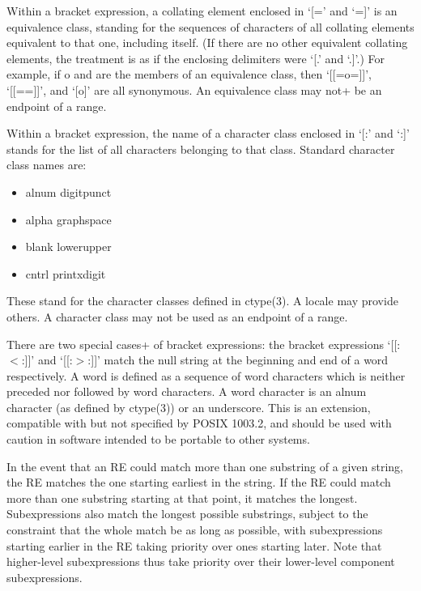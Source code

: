 Within a bracket expression, a collating element enclosed in `[=' and
`=]' is an equivalence class, standing for the sequences of characters
of all collating elements equivalent to that one, including itself.
(If there are no other equivalent collating elements, the treatment is
as if the enclosing delimiters were `[.' and `.]'.) For example, if o
and are the members of an equivalence class, then `[[=o=]]', `[[==]]',
and `[o]' are all synonymous. An equivalence class may not+ be an
endpoint of a range.

Within a bracket expression, the name of a character class enclosed in
`[:' and `:]' stands for the list of all characters belonging to that
class. Standard character class names are:

\begin{itemize}

\item alnum digitpunct
\item alpha graphspace
\item blank lowerupper
\item cntrl printxdigit

\end{itemize}

These stand for the character classes defined in ctype(3). A locale
may provide others. A character class may not be used as an endpoint
of a range.

There are two special cases+ of bracket expressions: the bracket
expressions `[[:$<$:]]' and `[[:$>$:]]' match the null string at the
beginning and end of a word respectively. A word is defined as a
sequence of word characters which is neither preceded nor followed by
word characters. A word character is an alnum character (as defined by
ctype(3)) or an underscore. This is an extension, compatible with but
not specified by POSIX 1003.2, and should be used with caution in
software intended to be portable to other systems.

In the event that an RE could match more than one substring of a given
string, the RE matches the one starting earliest in the string. If the
RE could match more than one substring starting at that point, it
matches the longest. Subexpressions also match the longest possible
substrings, subject to the constraint that the whole match be as long
as possible, with subexpressions starting earlier in the RE taking
priority over ones starting later. Note that higher-level
subexpressions thus take priority over their lower-level component
subexpressions.

